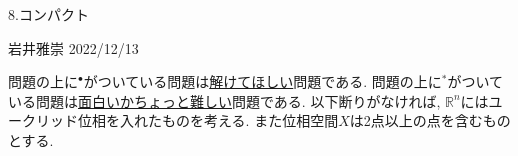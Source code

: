 \documentclass[dvipdfmx,a4paper,11pt]{article}
\newcommand{\R}{\mathbb{R}}
\theoremstyle{definition}
\begin{document}

\begin{center}
{\Large 8.コンパクト}
\end{center}

\begin{flushright}
 岩井雅崇 2022/12/13
\end{flushright}

問題の上に$^{\bullet}$がついている問題は\underline{解けてほしい}問題である. 問題の上に$^{*}$がついている問題は\underline{面白いかちょっと難しい}問題である.  
以下断りがなければ, $\R^{n}$にはユークリッド位相を入れたものを考える. 
また位相空間$X$は2点以上の点を含むものとする.
\end{document}
